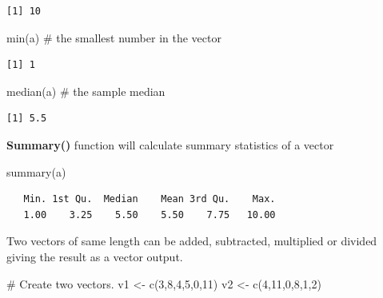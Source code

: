 \documentclass[
  letterpaper,
  DIV=11,
  numbers=noendperiod]{scrreprt}
\newenvironment{Shaded}{\begin{snugshade}}{\end{snugshade}}
\newcommand{\CommentTok}[1]{\textcolor[rgb]{0.37,0.37,0.37}{#1}}
\newcommand{\DecValTok}[1]{\textcolor[rgb]{0.68,0.00,0.00}{#1}}
\newcommand{\FunctionTok}[1]{\textcolor[rgb]{0.28,0.35,0.67}{#1}}
\newcommand{\NormalTok}[1]{\textcolor[rgb]{0.00,0.23,0.31}{#1}}
\newcommand{\OtherTok}[1]{\textcolor[rgb]{0.00,0.23,0.31}{#1}}
\begin{document}
\begin{verbatim}
[1] 10
\end{verbatim}

\begin{Shaded}
\begin{Highlighting}[]
\FunctionTok{min}\NormalTok{(a)        }\CommentTok{\# the smallest number in the vector }
\end{Highlighting}
\end{Shaded}

\begin{verbatim}
[1] 1
\end{verbatim}

\begin{Shaded}
\begin{Highlighting}[]
\FunctionTok{median}\NormalTok{(a)     }\CommentTok{\# the sample median }
\end{Highlighting}
\end{Shaded}

\begin{verbatim}
[1] 5.5
\end{verbatim}

\textbf{Summary()} function will calculate summary statistics of a
vector

\begin{Shaded}
\begin{Highlighting}[]
\FunctionTok{summary}\NormalTok{(a)}
\end{Highlighting}
\end{Shaded}

\begin{verbatim}
   Min. 1st Qu.  Median    Mean 3rd Qu.    Max. 
   1.00    3.25    5.50    5.50    7.75   10.00 
\end{verbatim}

Two vectors of same length can be added, subtracted, multiplied or
divided giving the result as a vector output.

\begin{Shaded}
\begin{Highlighting}[]
\CommentTok{\# Create two vectors.}
\NormalTok{v1 }\OtherTok{\textless{}{-}} \FunctionTok{c}\NormalTok{(}\DecValTok{3}\NormalTok{,}\DecValTok{8}\NormalTok{,}\DecValTok{4}\NormalTok{,}\DecValTok{5}\NormalTok{,}\DecValTok{0}\NormalTok{,}\DecValTok{11}\NormalTok{)}
\NormalTok{v2 }\OtherTok{\textless{}{-}} \FunctionTok{c}\NormalTok{(}\DecValTok{4}\NormalTok{,}\DecValTok{11}\NormalTok{,}\DecValTok{0}\NormalTok{,}\DecValTok{8}\NormalTok{,}\DecValTok{1}\NormalTok{,}\DecValTok{2}\NormalTok{)}
\end{Highlighting}
\end{Shaded}
\end{document}
